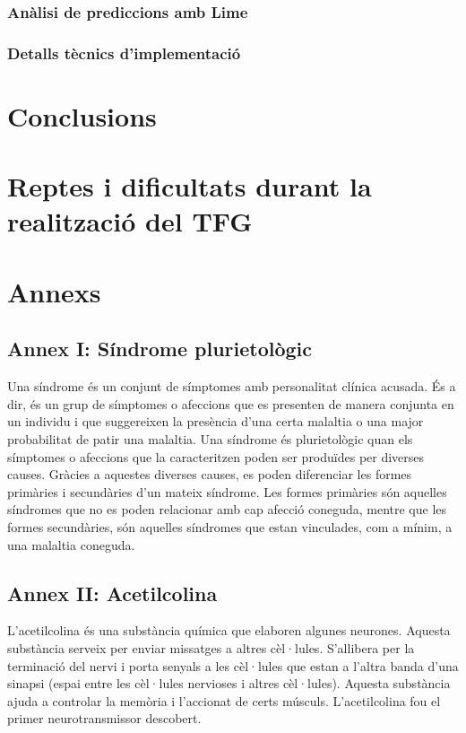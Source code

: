 \documentclass[a4paper,12pt]{article}
\begin{document}
\subsubsection*{Anàlisi de prediccions amb Lime}

\subsubsection*{Detalls tècnics d'implementació}

\section*{Conclusions}

\section*{Reptes i dificultats durant la realització del TFG}

\section*{Annexs}

\subsection*{Annex I: Síndrome plurietològic}
Una síndrome és un conjunt de símptomes amb personalitat clínica acusada. És a dir, és un grup de símptomes o afeccions que es presenten de manera conjunta en un individu i que suggereixen la presència d'una certa malaltia o una major probabilitat de patir una malaltia. Una síndrome és plurietològic quan els símptomes o afeccions que la caracteritzen poden ser produïdes per diverses causes. Gràcies a aquestes diverses causes, es poden diferenciar les formes primàries i secundàries d'un mateix síndrome. Les formes primàries són aquelles síndromes que no es poden relacionar amb cap afecció coneguda, mentre que les formes secundàries, són aquelles síndromes que estan vinculades, com a mínim, a una malaltia coneguda.
\subsection*{Annex II: Acetilcolina}
L'acetilcolina és una substància química que elaboren algunes neurones. Aquesta substància serveix per enviar missatges a altres cèl·lules. S'allibera per la terminació del nervi i porta senyals a les cèl·lules que estan a l'altra banda d'una sinapsi (espai entre les cèl·lules nervioses i altres cèl·lules). Aquesta substància ajuda a controlar la memòria i l'accionat de certs músculs. L'acetilcolina fou el primer neurotransmissor descobert.
\end{document}

